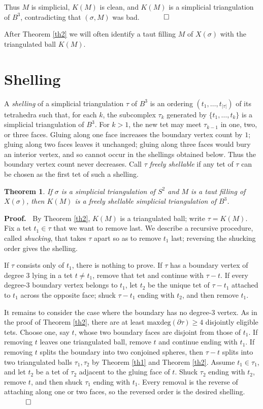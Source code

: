 \documentclass[12pt]{article}
\newtheorem{theorem}{Theorem}
\newcommand{\proofstart}{{\noindent \bf Proof.\ }}
\newcommand{\proofend}{$\quad \qed$}
\newcommand{\kw}{\mathrm}
\newcommand{\maxdeg}{\kw{maxdeg}}
\begin{document}
Thus $M$ is simplicial, $K(M)$ is clean, and $K(M)$ is a simplicial
triangulation of $B^3$, contradicting that $(\sigma,M)$ was bad.
\proofend

After Theorem \ref{th2} we will often identify a taut filling $M$ of
$X(\sigma)$ with the triangulated ball $K(M)$.

\section{Shelling}

A \emph{shelling} of a simplicial triangulation $\tau$ of $B^3$
is an ordering
$(t_1,\ldots,t_{|\tau|})$
of its tetrahedra such that, for each $k$,
the subcomplex $\tau_k$ generated by $\{t_1,\ldots,t_k\}$ is a
simplicial triangulation of $B^3$.
For $k>1$, the new tet may meet $\tau_{k-1}$ in one, two, or three
faces. Gluing along one face increases the boundary vertex count by $1$;
gluing along two faces leaves it unchanged; gluing along three faces
would bury an interior vertex, and so cannot occur in the shellings
obtained below. Thus the boundary vertex count never decreases.
Call $\tau$ \emph{freely shellable} if any tet of $\tau$ can be chosen as
the first tet of such a shelling.

\begin{theorem} \label{th3}
If $\sigma$ is a simplicial triangulation of $S^2$ and $M$ is a taut
filling of $X(\sigma)$, then $K(M)$ is a freely shellable simplicial
triangulation of $B^3$.
\end{theorem}

\proofstart
By Theorem \ref{th2}, $K(M)$ is a triangulated ball; write $\tau = K(M)$.
Fix a tet $t_1 \in \tau$ that we want to remove last.  We describe a
recursive procedure, called \emph{shucking}, that takes $\tau$ apart
so as to remove $t_1$ last; reversing the shucking order gives the
shelling.

If $\tau$ consists only of $t_1$, there is nothing to prove.
If $\tau$ has a boundary vertex of degree $3$ lying in a tet
$t\ne t_1$, remove that tet and continue with $\tau-t$.
If every degree-$3$ boundary vertex belongs to $t_1$, let $t_2$ be the
unique tet of $\tau-t_1$ attached to $t_1$ across the opposite face;
shuck $\tau-t_1$ ending with $t_2$, and then remove $t_1$.

It remains to consider the case where the boundary has no degree-$3$
vertex.  As in the proof of Theorem \ref{th2}, there are at least
$\maxdeg(\partial \tau)\geq 4$ disjointly eligible tets.
Choose one, say $t$, whose two boundary faces are disjoint from those of
$t_1$.
If removing $t$ leaves one triangulated ball, remove $t$ and continue
ending with $t_1$.
If removing $t$ splits the boundary into two conjoined spheres, then
$\tau-t$ splits into two triangulated balls $\tau_1,\tau_2$ by
Theorem \ref{th1} and Theorem \ref{th2}.
Assume $t_1\in \tau_1$, and let $t_2$ be a tet of $\tau_2$ adjacent to
the gluing face of $t$.
Shuck $\tau_2$ ending with $t_2$, remove $t$, and then shuck
$\tau_1$ ending with $t_1$.
Every removal is the reverse of attaching along one or two faces, so the
reversed order is the desired shelling.
\proofend
\end{document}
